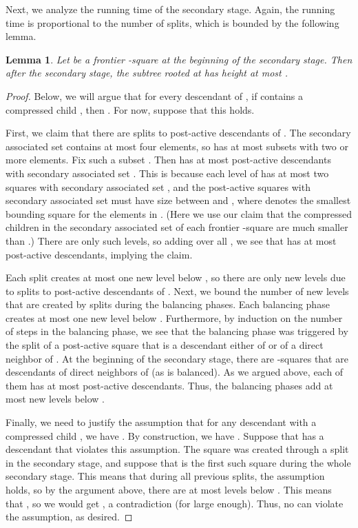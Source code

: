 \documentclass[11pt]{paper}
\newtheorem {lem}[theorem] {Lemma}
\begin{document}
      Next, we analyze the running time of the secondary stage. Again,
      the running time is proportional to the number of splits, which
      is bounded by the following lemma.

      \begin{lem}\label{lem:secondary-bound}
         Let  be a frontier -square at the beginning of the
	 secondary stage. Then after the secondary stage, the subtree
	 rooted at  has height at most .
      \end{lem}
      \begin{proof}
      Below, we will argue that for every descendant  of ,
      if  contains a compressed child , then
      . For now, suppose that this holds.

      First, we claim that there are  splits
      to post-active descendants of . 
      The secondary associated set  contains at most four 
      elements, so  has at most  subsets with
      two or more elements. Fix such a subset .
      Then  has at most  post-active
      descendants with secondary associated set .
      This is because each level of  has at most two squares
      with secondary associated set , and 
      the post-active squares with secondary associated set 
      must have size between  and 
      , where  denotes the
      smallest bounding square for the elements in . 
      (Here we use our claim that the compressed children in
      the secondary associated set of each frontier -square 
       are much smaller
      than .) There are only  such levels, so
      adding over all , we see that  has 
      at most  post-active descendants, implying the
      claim.

      Each split creates at most one new level below ,
      so there are only  new levels 
      due to splits to post-active descendants of .
      Next, we bound the number of new levels that are created by
      splits during the balancing phases. Each balancing phase
      creates at most one new level below .
      Furthermore, by induction on the number of steps in the 
      balancing phase, we see that the balancing phase was
      triggered by the split of a post-active square
      that is a descendant either of  or of a direct neighbor
      of .
      At the beginning of the secondary stage, there
      are   -squares that are descendants of direct 
      neighbors of  (as  is balanced). As we argued above, each 
      of them has at most  post-active descendants.
      Thus, the balancing phases add at most  new levels below
      .
      
      Finally, we need to justify the assumption that for any descendant 
      with a compressed child , we have .
      By construction, we have . Suppose that 
      has a descendant  that violates this assumption. The square  was
      created through a split in the secondary stage, and suppose that 
      is the first such square during the whole secondary stage. This means
      that during all previous splits, the assumption holds, so by the
      argument above, there are at most  levels below . 
      This means that , so we would get
      ,
      a contradiction (for  large enough). Thus, no  can violate the
      assumption, as desired.
      \end{proof}
       
\end{document}
